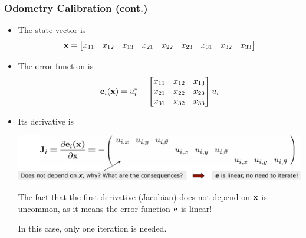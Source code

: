 \begin{frame}
    \frametitle{Odometry Calibration (cont.)}
    \begin{itemize}

        \item The state vector is 
        \begin{equation*}
            \boldsymbol{\mathbf{x}} =
            \begin{bmatrix}
                x_{11} & x_{12} & x_{13} & x_{21} & x_{22} & x_{23} & x_{31} & x_{32} & x_{33}
            \end{bmatrix}
        \end{equation*}
        \item The error function is
        \begin{equation*}
            \boldsymbol{\mathbf{e}}_{i}(\boldsymbol{\mathbf{x}}) = u_{i}^{*} - 
            \begin{bmatrix}
                x_{11} & x_{12} & x_{13} \\
                x_{21} & x_{22} & x_{23} \\
                x_{31} & x_{32} & x_{33}
            \end{bmatrix}
            u_{i}
        \end{equation*}
        \item Its derivative is
        
        \begin{center}
            \includegraphics[width=0.8\columnwidth]{images/odometry_calibration_jacobian.pdf}
        \end{center}
        
        The fact that the first derivative (Jacobian) does not depend on $\boldsymbol{\mathbf{x}}$ is uncommon, as it means the error function $\boldsymbol{\mathbf{e}}$ is linear!
        
        In this case, only one iteration is needed.

    \end{itemize}

    
\end{frame}

